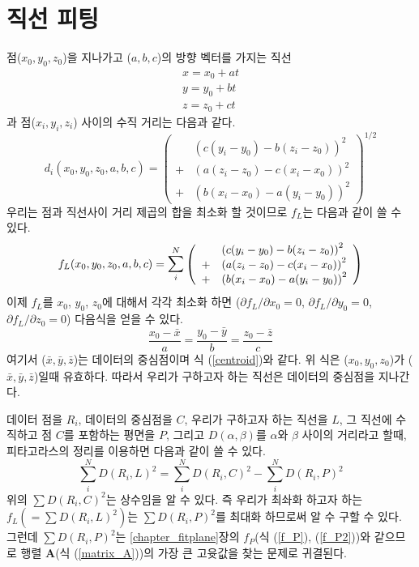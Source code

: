 \documentclass[a4paper,14pt]{oblivoir}
\begin{document}
\chapter{직선 피팅}
점($x_0, y_0, z_0$)을 지나가고 ($a,b,c$)의 방향 벡터를 가지는 직선
\begin{equation}
\left.
\begin{array}{ll}
x = x_0 + at \\\nonumber
y = y_0 + bt \\\nonumber
z = z_0 + ct
\end{array}\right.
\end{equation}
과 점($x_i, y_i, z_i$) 사이의 수직 거리는 다음과 같다.
\begin{equation}
d_i(x_0,y_0,z_0,a,b,c) = \left( 
\begin{array}{ll}
  &\left(c(y_i-y_0) - b(z_i - z_0)\right)^2 \\
  + &\left(a(z_i-z_0) - c(x_i - x_0)\right)^2 \\
  + &\left(b(x_i-x_0) - a(y_i - y_0)\right)^2 
\end{array} \right)^{1/2}
\end{equation}
우리는 점과 직선사이 거리 제곱의 합을 최소화 할 것이므로 $f_L$는 다음과 같이 쓸 수 있다.
\begin{equation}
f_L(x_0,y_0,z_0,a,b,c) = \mathlarger\sum_i^N\left( 
\begin{array}{ll}
  &\left(c(y_i-y_0) - b(z_i - z_0)\right)^2 \\
  + &\left(a(z_i-z_0) - c(x_i - x_0)\right)^2 \\
  + &\left(b(x_i-x_0) - a(y_i - y_0)\right)^2 
\end{array} \right)
\end{equation}
이제 $f_L$를 $x_0$, $y_0$, $z_0$에 대해서 각각 최소화 하면
(${\partial f_L}/{\partial x_0}=0$, ${\partial f_L}/{\partial y_0}=0$, ${\partial f_L}/{\partial z_0}=0$)
다음식을 얻을 수 있다.
\begin{equation}
\frac{x_0-\bar x}{a} = \frac{y_0-\bar y}{b} = \frac{z_0-\bar z}{c}
\end{equation}
여기서 ($\bar{x}, \bar{y}, \bar{z}$)는 데이터의 중심점이며 식 (\ref{centroid})와 같다.
위 식은 ($x_0,y_0,z_0$)가 ($\bar x,\bar y,\bar z$)일때 유효하다.
따라서 우리가 구하고자 하는 직선은 데이터의 중심점을 지나간다.

데이터 점을 $R_i$, 데이터의 중심점을 $C$, 우리가 구하고자 하는 직선을 $L$, 
그 직선에 수직하고 점 $C$를 포함하는 평면을 $P$, 그리고 
$D(\alpha, \beta)$를 $\alpha$와 $\beta$ 사이의 거리라고 할때, 
피타고라스의 정리를 이용하면 다음과 같이 쓸 수 있다.
\begin{equation}
\sum_i^N D(R_i, L)^2 = \sum_i^N D(R_i, C)^2 - \sum_i^N D(R_i, P)^2
\end{equation}
위의 $\sum D(R_i, C)^2$는 상수임을 알 수 있다.
즉 우리가 최솨화 하고자 하는 $f_L(=\sum D(R_i, L)^2)$는 
$\sum D(R_i, P)^2$를 최대화 하므로써 알 수 구할 수 있다.
그런데 $\sum D(R_i, P)^2$는 \ref{chapter_fitplane}장의 $f_P$(식 (\ref{f_P}), (\ref{f_P2}))와 같으므로
행렬 $\mathbf{A}$(식 (\ref{matrix_A}))의 가장 큰 고윳값을 찾는 문제로 귀결된다.
\end{document}
